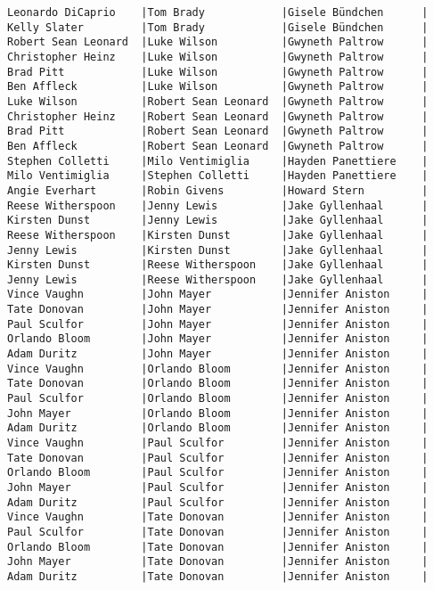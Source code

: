 \documentclass{article}
\begin{document}
\begin{verbatim}
Leonardo DiCaprio    |Tom Brady            |Gisele Bündchen      |
Kelly Slater         |Tom Brady            |Gisele Bündchen      |
Robert Sean Leonard  |Luke Wilson          |Gwyneth Paltrow      |
Christopher Heinz    |Luke Wilson          |Gwyneth Paltrow      |
Brad Pitt            |Luke Wilson          |Gwyneth Paltrow      |
Ben Affleck          |Luke Wilson          |Gwyneth Paltrow      |
Luke Wilson          |Robert Sean Leonard  |Gwyneth Paltrow      |
Christopher Heinz    |Robert Sean Leonard  |Gwyneth Paltrow      |
Brad Pitt            |Robert Sean Leonard  |Gwyneth Paltrow      |
Ben Affleck          |Robert Sean Leonard  |Gwyneth Paltrow      |
Stephen Colletti     |Milo Ventimiglia     |Hayden Panettiere    |
Milo Ventimiglia     |Stephen Colletti     |Hayden Panettiere    |
Angie Everhart       |Robin Givens         |Howard Stern         |
Reese Witherspoon    |Jenny Lewis          |Jake Gyllenhaal      |
Kirsten Dunst        |Jenny Lewis          |Jake Gyllenhaal      |
Reese Witherspoon    |Kirsten Dunst        |Jake Gyllenhaal      |
Jenny Lewis          |Kirsten Dunst        |Jake Gyllenhaal      |
Kirsten Dunst        |Reese Witherspoon    |Jake Gyllenhaal      |
Jenny Lewis          |Reese Witherspoon    |Jake Gyllenhaal      |
Vince Vaughn         |John Mayer           |Jennifer Aniston     |
Tate Donovan         |John Mayer           |Jennifer Aniston     |
Paul Sculfor         |John Mayer           |Jennifer Aniston     |
Orlando Bloom        |John Mayer           |Jennifer Aniston     |
Adam Duritz          |John Mayer           |Jennifer Aniston     |
Vince Vaughn         |Orlando Bloom        |Jennifer Aniston     |
Tate Donovan         |Orlando Bloom        |Jennifer Aniston     |
Paul Sculfor         |Orlando Bloom        |Jennifer Aniston     |
John Mayer           |Orlando Bloom        |Jennifer Aniston     |
Adam Duritz          |Orlando Bloom        |Jennifer Aniston     |
Vince Vaughn         |Paul Sculfor         |Jennifer Aniston     |
Tate Donovan         |Paul Sculfor         |Jennifer Aniston     |
Orlando Bloom        |Paul Sculfor         |Jennifer Aniston     |
John Mayer           |Paul Sculfor         |Jennifer Aniston     |
Adam Duritz          |Paul Sculfor         |Jennifer Aniston     |
Vince Vaughn         |Tate Donovan         |Jennifer Aniston     |
Paul Sculfor         |Tate Donovan         |Jennifer Aniston     |
Orlando Bloom        |Tate Donovan         |Jennifer Aniston     |
John Mayer           |Tate Donovan         |Jennifer Aniston     |
Adam Duritz          |Tate Donovan         |Jennifer Aniston     |

\end{verbatim}
\end{document}
